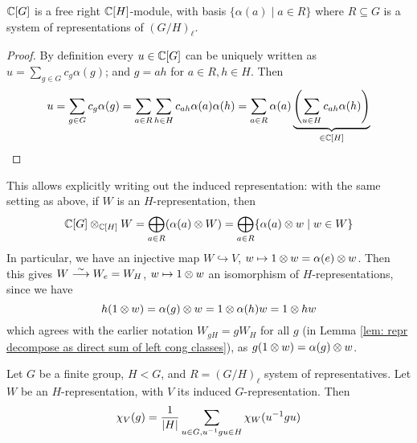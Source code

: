 \documentclass{article}
\begin{document}
\begin{claim}
    $\mathbb{C}[G]$ is a free right $\mathbb{C}[H]$-module, with basis $\{ \alpha(a) \mid a \in R \}$ where $R \subseteq G$ is a system of representations of $(G/H)_{\ell}$.
\end{claim}

\begin{proof}
    By definition every $u \in \mathbb{C}[G]$ can be uniquely written as $u = \sum_{g \in G} c_g \alpha(g)$; and $g = ah$ for $a \in R, h \in H$. Then
    \[
        u = \sum_{g \in G} c_g \alpha(g) = \sum_{a \in R} \sum_{h \in H} c_{ah} \alpha(a) \alpha(h) = \sum_{a \in R} \alpha(a) \underbrace{\left( \sum_{u \in H} c_{ah} \alpha(h) \right)}_{\in \mathbb{C}[H]}
    \]
\end{proof}

This allows explicitly writing out the induced representation: with the same setting as above, if $W$ is an $H$-representation, then 
\[
    \mathbb{C}[G] \otimes_{\mathbb{C}[H]} W = \bigoplus_{a \in R} (\alpha(a) \otimes W) = \bigoplus_{a \in R} \{ \alpha(a) \otimes w \mid w \in W \}
\]
In particular, we have an injective map $W \hookrightarrow V$, $w \mapsto 1 \otimes w = \alpha(e) \otimes w$. Then this gives $W \overset{\sim}{\longrightarrow} W_e = W_H$, $w \mapsto 1 \otimes w$ an isomorphism of $H$-representations, since we have
\[
    h (1 \otimes w) = \alpha(g) \otimes w = 1 \otimes \alpha(h) w = 1 \otimes hw
\]
which agrees with the earlier notation $W_{gH} = g W_H$ for all $g$ (in Lemma \ref{lem: repr decompose as direct sum of left cong classes}), as $g(1 \otimes w) = \alpha(g) \otimes w$.

\begin{proposition}\label{prop: induced character}
    Let $G$ be a finite group, $H < G$, and $R = (G/H)_{\ell}$ system of representatives. Let $W$ be an $H$-representation, with $V$ its induced $G$-representation. Then
    \[
        \chi_V (g) = \frac{1}{\left|H\right|} \sum_{u \in G, u^{-1}gu \in H} \chi_W (u^{-1} g u)
    \]
\end{proposition}
\end{document}
